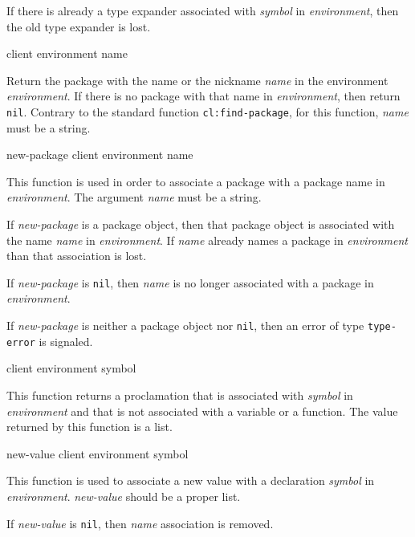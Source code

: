 If there is already a type expander associated with \textit{symbol} in
\textit{environment}, then the old type expander is lost.

 {client environment name}

Return the package with the name or the nickname \textit{name} in the
environment \textit{environment}.  If there is no package with that
name in \textit{environment}, then return \texttt{nil}.  Contrary to
the standard \commonlisp{} function \texttt{cl:find-package}, for this
function, \textit{name} must be a string.

 {new-package client environment name}

This function is used in order to associate a package with a package
name in \textit{environment}.  The argument \textit{name} must be a
string.

If \textit{new-package} is a package object, then that package object
is associated with the name \textit{name} in
\textit{environment}.  If \textit{name} already names a package in
\textit{environment} than that association is lost.

If \textit{new-package} is \texttt{nil}, then \textit{name} is no
longer associated with a package in \textit{environment}.

If \textit{new-package} is neither a package object nor \texttt{nil},
then an error of type \texttt{type-error} is signaled.

 {client environment symbol}

This function returns a proclamation that is associated with
\textit{symbol} in \textit{environment} and that is not associated with a
variable or a function.  The value returned by this function is a list.

 {new-value client environment symbol}

This function is used to associate a new value with a declaration
\textit{symbol} in \textit{environment}. \textit{new-value} should be
a proper list.

If \textit{new-value} is \texttt{nil}, then \textit{name} association is removed.

